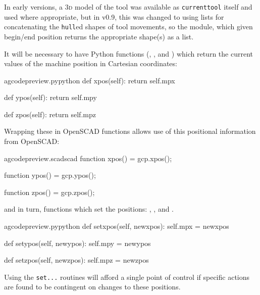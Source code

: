 \documentclass{ltxdoc}
\begin{document}
In early versions, a \textsc{3d} model of the tool was available as \verb|currenttool| itself and used where appropriate, but in v0.9, this was changed to using lists for concatenating the \verb|hull|ed shapes of tool movements, so the module,  which given begin/end position returns the appropriate shape(s) as a list.

It will be necessary to have Python functions (, , and ) which return the current values of the machine position in Cartesian coordinates: 

\lstset{firstnumber=\thegcpy}
\begin{writecode}{a}{gcodepreview.py}{python}
    def xpos(self):
        return self.mpx

    def ypos(self):
        return self.mpy

    def zpos(self):
        return self.mpz

\end{writecode}
\addtocounter{gcpy}{9}

Wrapping these in OpenSCAD functions allows use of this positional information from OpenSCAD:

\lstset{firstnumber=\thegcpscad}
\begin{writecode}{a}{gcodepreview.scad}{scad}
function xpos() = gcp.xpos();

function ypos() = gcp.ypos();

function zpos() = gcp.zpos();

\end{writecode}
\addtocounter{gcpscad}{6}

\noindent and in turn, functions which set the positions: 
, 
, and
.%

\lstset{firstnumber=\thegcpy}
\begin{writecode}{a}{gcodepreview.py}{python}
    def setxpos(self, newxpos):
        self.mpx = newxpos

    def setypos(self, newypos):
        self.mpy = newypos

    def setzpos(self, newzpos):
        self.mpz = newzpos

\end{writecode}
\addtocounter{gcpy}{9}

\noindent Using the \verb|set...| routines will afford a single point of control if specific actions are found to be contingent on changes to these positions.
\end{document}
